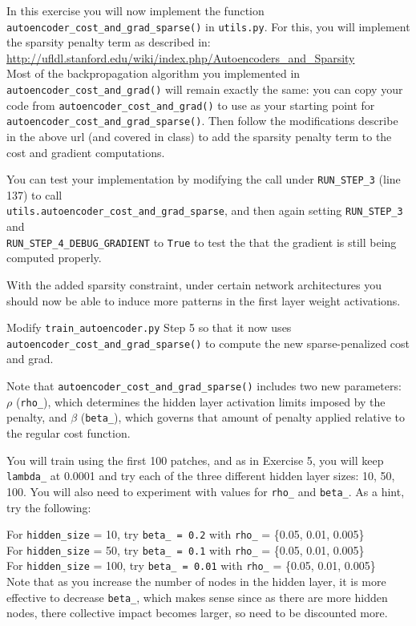 \documentclass[10pt]{article}
\begin{document}
\begin{itemize}
In this exercise you will now implement the function {\tt autoencoder\_cost\_and\_grad\_sparse()} in {\tt utils.py}.  For this, you will implement the sparsity penalty term as described in:\\
\hspace{2cm}\url{http://ufldl.stanford.edu/wiki/index.php/Autoencoders_and_Sparsity}\\
Most of the backpropagation algorithm you implemented in {\tt autoencoder\_cost\_and\_grad()} will remain exactly the same: you can copy your code from {\tt autoencoder\_cost\_and\_grad()} to use as your starting point for {\tt autoencoder\_cost\_and\_grad\_sparse()}.  Then follow the modifications describe in the above url (and covered in class) to add the sparsity penalty term to the cost and gradient computations.

You can test your implementation by modifying the call under {\tt RUN\_STEP\_3} (line 137) to call \\ {\tt utils.autoencoder\_cost\_and\_grad\_sparse}, and then again setting {\tt RUN\_STEP\_3} and \\ {\tt RUN\_STEP\_4\_DEBUG\_GRADIENT} to {\tt True} to test the that the gradient is still being computed properly.

With the added sparsity constraint, under certain network architectures you should now be able to induce more patterns in the first layer weight activations.

Modify {\tt train\_autoencoder.py} Step 5 so that it now uses {\tt autoencoder\_cost\_and\_grad\_sparse()} to compute the new sparse-penalized cost and grad.

Note that {\tt autoencoder\_cost\_and\_grad\_sparse()} includes two new parameters: $\rho$ ({\tt rho\_}), which determines the hidden layer activation limits imposed by the penalty, and $\beta$ ({\tt beta\_}), which governs that amount of penalty applied relative to the regular cost function.   

You will train using the first 100 patches, and as in Exercise 5, you will keep {\tt lambda\_} at 0.0001 and try each of the three different hidden layer sizes: 10, 50, 100.  You will also need to experiment with values for {\tt rho\_} and {\tt beta\_}.  
As a hint, try the following:

For {\tt hidden\_size} = 10, try {\tt beta\_ = 0.2} with {\tt rho\_} = \{0.05, 0.01, 0.005\}\\
For {\tt hidden\_size} = 50, try {\tt beta\_ = 0.1} with {\tt rho\_} = \{0.05, 0.01, 0.005\}\\
For {\tt hidden\_size} = 100, try {\tt beta\_ = 0.01} with {\tt rho\_} = \{0.05, 0.01, 0.005\}\\
Note that as you increase the number of nodes in the hidden layer, it is more effective to decrease {\tt beta\_}, which makes sense since as there are more hidden nodes, there collective impact becomes larger, so need to be discounted more.


\end{itemize}
\end{document}
